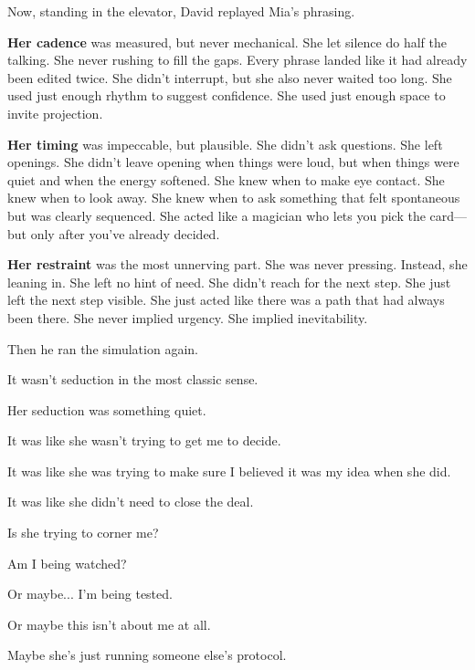 Now, standing in the elevator, David replayed Mia’s phrasing.

\textbf{Her cadence} was measured, but never mechanical.
She let silence do half the talking. She never rushing to fill the gaps.
Every phrase landed like it had already been edited twice.
She didn’t interrupt, but she also never waited too long.
She used just enough rhythm to suggest confidence.
She used just enough space to invite projection.

\textbf{Her timing} was impeccable, but plausible.
She didn’t ask questions. She left openings.
She didn't leave opening when things were loud, but when things were quiet
and when the energy softened.
She knew when to make eye contact. 
She knew when to look away. 
She knew when to ask something that felt spontaneous but was clearly sequenced.
She acted like a magician who lets you pick the card—but only after you've already decided.

\textbf{Her restraint} was the most unnerving part.
She was never pressing. Instead, she leaning in. She left no hint of need.
She didn’t reach for the next step. She just left the next step visible.
She just acted like there was a path that had always been there.
She never implied urgency.
She implied inevitability.

Then he ran the simulation again.

\begin{tcolorbox}[
    enhanced,
    sharp corners,
    boxrule=0pt,
    colback=gray!3,
    borderline west={2pt}{0pt}{gray!60}, %
    left=10pt,
    right=10pt,
    top=6pt,
    bottom=6pt,
    width=\linewidth,
    fontupper=\small\itshape
  ]
It wasn’t seduction in the most classic sense.

Her seduction was something quiet.

It was like she wasn’t trying to get me to decide.

It was like she was trying to make sure I believed it was my idea when she did.

It was like she didn’t need to close the deal.

Is she trying to corner me?

Am I being watched?

Or maybe... I'm being tested. 

Or maybe this  isn't about me at all.

Maybe she's just running someone else's protocol.
\end{tcolorbox}


